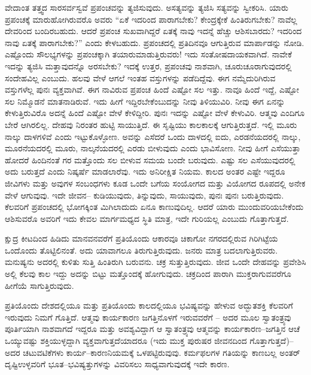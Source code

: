 \vskip 0.2cm

ವೇದಾಂತ ತತ್ತ್ವದ ಸಾರಸರ್ವಸ್ವವೆ ಪ್ರಪಂಚವನ್ನು ತ್ಯಜಿಸುವುದು. ಅಸತ್ಯವನ್ನು ತ್ಯಜಿಸಿ ಸತ್ಯವನ್ನು ಸ್ವೀಕರಿಸಿ. ಯಾರು ಪ್ರಪಂಚಕ್ಕೆ ಮಾರುಹೋಗಿರುವರೊ ಅವರು “ಏಕೆ ಇದರಿಂದ ಪಾರಾಗಬೇಕು? ಕೇಂದ್ರಕ್ಕೇಕೆ ಹಿಂತಿರುಗಬೇಕು? ನಾವೆಲ್ಲ ದೇವರಿಂದ ಬಂದಿರಬಹುದು. ಆದರೆ ಪ್ರಪಂಚ ಸುಖವಾಗಿದ್ದರೆ ಏತಕ್ಕೆ ನಾವು ಇದನ್ನೆ ಹೆಚ್ಚು ಆಶಿಸಬಾರದು? ಇದರಿಂದ ನಾವು ಏತಕ್ಕೆ ಪಾರಾಗಬೇಕು?” ಎಂದು ಕೇಳಬಹುದು. ಪ್ರಪಂಚದಲ್ಲಿ ಪ್ರತಿದಿನವೂ ಆಗುತ್ತಿರುವ ಮಾರ್ಪಾಡನ್ನು ನೋಡಿ. ಎಷ್ಟೊಂದು ಸೌಲಭ್ಯಗಳನ್ನು ಪ್ರಪಂಚಕ್ಕಾಗಿ ತಯಾರುಮಾಡುತ್ತಿರುವರು! ಇದು ಸಂತೋಷದಾಯಕವಾಗಿದೆ. ನಾವೇಕೆ ಇದನ್ನು ತ್ಯಜಿಸಿ ಮತ್ತಾವುದನ್ನೊ ಅರಸಬೇಕು? ಇದಕ್ಕೆ ಉತ್ತರ, ಪ್ರಪಂಚವು ನಾಶವಾಗಿ, ಚೂರುಚೂರಾಗುವುದರಲ್ಲಿ ಸಂದೇಹವಿಲ್ಲ ಎಂಬುದು. ಹಲವು ವೇಳೆ ಆಗಲೆ ಇಂತಹ ವಸ್ತುಗಳನ್ನು ಪಡೆದಿದ್ದೆವು. ಈಗ ನಮ್ಮೆದುರಿಗಿರುವ ವಸ್ತುಗಳೆಲ್ಲ ಪುನಃ ವ್ಯಕ್ತವಾಗಿವೆ. ಈಗ ನಾವಿರುವ ಪ್ರಪಂಚ ಹಿಂದೆ ಎಷ್ಟೋ ಸಲ ಇತ್ತು. ನಾವೂ ಹಿಂದೆ ಇದ್ದೆ, ಎಷ್ಟೋ ಸಲ ನಿಮ್ಮೊಡನೆ ಮಾತನಾಡಿರುವೆ. ಇದು ಹೀಗೆ ಇದ್ದಿರಬೇಕೆಂಬುದನ್ನು ನೀವು ತಿಳಿಯುವಿರಿ. ನೀವು ಈಗ ಏನನ್ನು ಕೇಳುತ್ತಿರುವಿರೊ ಅದನ್ನೆ ಹಿಂದೆ ಎಷ್ಟೋ ವೇಳೆ ಕೇಳಿದ್ದೀರಿ. ಪುನಃ ಇದನ್ನು ಎಷ್ಟೋ ವೇಳೆ ಕೇಳುವಿರಿ. ಆತ್ಮವು ಎಂದಿಗೂ ಬೇರೆ ಆಗಿರಲಿಲ್ಲ. ದೇಹವು ನಿರಂತರ ಹುಟ್ಟಿ ಸಾಯುತ್ತಿದೆ. ಈ ಸೃಷ್ಟಿಯು ಕಾಲಕಾಲಕ್ಕೆ ಆಗುತ್ತಿರುತ್ತದೆ. ಇಲ್ಲಿ ಮೂರು ನಾಲ್ಕು ದಾಳಗಳಿವೆ ಎಂದು ಇಟ್ಟುಕೊಳ್ಳೋಣ. ಅವನ್ನು ಎಸೆದರೆ ಒಂದು ದಾಳದಲ್ಲಿ ಐದು, ಎರಡನೆಯದರಲ್ಲಿ ನಾಲ್ಕು, ಮೂರನೆಯದರಲ್ಲಿ ಮೂರು, ನಾಲ್ಕನೆಯದರಲ್ಲಿ ಎರಡು ಬೀಳುವುದು ಎಂದು ಭಾವಿಸೋಣ. ನೀವು ಹೀಗೆ ಎಸೆಯುತ್ತಾ ಹೋದರೆ ಹಿಂದಿನಂತೆ ಗರ ಮತ್ತೊಂದು ಸಲ ಬೀಳುವ ಸಮಯ ಬಂದೇ ಬರುವುದು. ಎಷ್ಟು ಸಲ ಎಸೆಯುವುದರಲ್ಲಿ ಅದು ಬರುತ್ತದೆ ಎಂದು ನಿಷ್ಕರ್ಷೆ ಮಾಡಲಾರೆವು. ಇದು ಅನಿರೀಕ್ಷಿತ ನಿಯಮ. ಕಾಲದ ಅಂತರ ಎಷ್ಟೇ ಇದ್ದರೂ ಜೀವಿಗಳು ಮತ್ತು ಅವುಗಳ ಸಂಬಂಧಗಳು ಕೂಡ ಒಂದೇ ಬಗೆಯ ಸಂಯೋಗದ ಮತ್ತು ವಿಯೋಗದ ರೂಪದಲ್ಲಿ ಅನೇಕ ವೇಳೆ ಆಗುವುವು. ಇದೇ ಜೀವನ– ಕುಡಿಯುವುದು, ತಿನ್ನುವುದು, ಸಾಯುವುದು, ಪುನಃ ಪುನಃ ಬರುತ್ತಿರುವುದು. ಕೆಲವರಿಗೆ ಪ್ರಪಂಚದಲ್ಲಿ ಭೋಗಕ್ಕಿಂತ ಮಿಗಿಲಾದುದು ಏನೂ ಕಾಣುವುದಿಲ್ಲ. ಆದರೆ ಯಾರು ಮುಂದುವರಿಯಬೇಕೆಂದು ಆಶಿಸುವರೊ ಅವರಿಗೆ ಇದು ಕೇವಲ ಮಾರ್ಗಮಧ್ಯದ ಸ್ಥಿತಿ ಮಾತ್ರ, ಇದೇ ಗುರಿಯಲ್ಲ ಎಂಬುದು ಗೊತ್ತಾಗುತ್ತದೆ.

\vskip 0.2cm

ಕ್ಷುದ್ರ ಕೀಟದಿಂದ ಹಿಡಿದು ಮಾನವನವರೆಗೆ ಪ್ರತಿಯೊಂದು ಆಕಾರವೂ ಚಿಕಾಗೋ ನಗರದಲ್ಲಿರುವ ಗಿರಿಗಿಟ್ಟೆಯ ಒಂದೊಂದು ತೊಟ್ಟಿಲಿನಂತೆ. ಅದು ಯಾವಾಗಲೂ ತಿರುಗುತ್ತಿರುವುದು. ಜನರು ಮಾತ್ರ ಬದಲಾಗುತ್ತಿರುವರು. ಮನುಷ್ಯನು ಅದರಲ್ಲಿ ಕುಳಿತು ಸುತ್ತಿ ಹಿಂತಿರುಗಿ ಬರುವನು. ಚಕ್ರ ಸುತ್ತುತ್ತಿರುವುದು. ಜೀವ ಒಂದೇ ದೇಹವನ್ನು ಪ್ರವೇಶಿಸಿ ಅಲ್ಲಿ ಕೆಲವು ಕಾಲ ಇದ್ದು ಅದನ್ನು ಬಿಟ್ಟು ಮತ್ತೊಂದಕ್ಕೆ ಹೋಗುವುದು. ಚಕ್ರದಿಂದ ಪಾರಾಗಿ ಮುಕ್ತರಾಗುವವರೆಗೂ ಹೀಗೆಯೆ ಸಾಗುತ್ತಿರುವುದು.

\vskip 0.2cm

ಪ್ರತಿಯೊಂದು ದೇಶದಲ್ಲಿಯೂ ಮತ್ತು ಪ್ರತಿಯೊಂದು ಕಾಲದಲ್ಲಿಯೂ ಭವಿಷ್ಯವನ್ನು ಹೇಳುವ ಅದ್ಭುತಶಕ್ತಿ ಕೆಲವರಿಗೆ ಇರುವುದು ನಿಮಗೆ ಗೊತ್ತಿದೆ. ಆತ್ಮವು ಕಾರ್ಯಕಾರಣ ಜಗತ್ತಿನೊಳಗೆ ಇರುವವರೆಗೆ – ಅದರ ಮೂಲ ಸ್ವಾತಂತ್ರ್ಯವು ಪೂರ್ತಿಯಾಗಿ ನಾಶವಾಗದೆ ಇದ್ದರೂ ಮತ್ತು ಅವಶ್ಯವಿದ್ದಾಗ ಆ ಸ್ವಾತಂತ್ರ್ಯವು ಆತ್ಮವನ್ನು ಕಾರ್ಯಕಾರಣ–ಜಗತ್ತಿನ ಆಚೆ ಒಯ್ಯುವಷ್ಟು ಶಕ್ತಿಯುಳ್ಳದ್ದಾಗಿ ವ್ಯಕ್ತವಾಗುತ್ತದೆಯಾದರೂ (ಇದು ಮುಕ್ತ ಪುರುಷರ ಜೀವನದಿಂದ ಗೊತ್ತಾಗುತ್ತದೆ)– ಅದರ ಚಟುವಟಿಕೆಗಳು ಕಾರ್ಯ–ಕಾರಣನಿಯಮಕ್ಕೆ ಒಳಪಟ್ಟಿರುವುವು. ಕರ್ಮಫಲಗಳ ಗತಿಯನ್ನು ಕಾಣಬಲ್ಲ ಅಂತರ್​ದೃಷ್ಟಿಉಳ್ಳವರಿಗೆ ಭೂತ–ಭವಿಷ್ಯತ್ತುಗಳನ್ನು ವಿವರಿಸಲು ಸಾಧ್ಯವಾಗುವುದಕ್ಕೆ ಇದೇ ಕಾರಣ.

